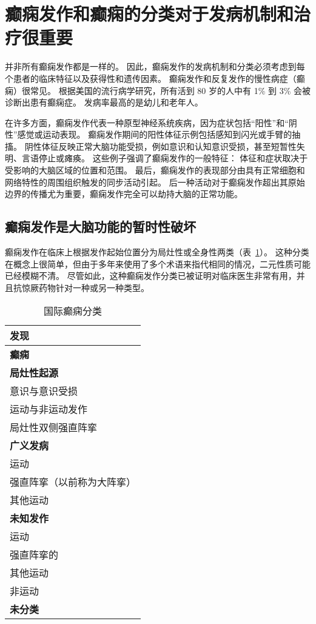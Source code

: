 \section{癫痫发作和癫痫的分类对于发病机制和治疗很重要}

并非所有癫痫发作都是一样的。
因此，癫痫发作的发病机制和分类必须考虑到每个患者的临床特征以及获得性和遗传因素。
癫痫发作和反复发作的慢性病症（癫痫）很常见。
根据美国的流行病学研究，所有活到 80 岁的人中有 1\% 到 3\% 会被诊断出患有癫痫症。
发病率最高的是幼儿和老年人。


在许多方面，癫痫发作代表一种原型神经系统疾病，因为症状包括“阳性”和“阴性”感觉或运动表现。
癫痫发作期间的阳性体征示例包括感知到闪光或手臂的抽搐。
阴性体征反映正常大脑功能受损，例如意识和认知意识受损，甚至短暂性失明、言语停止或瘫痪。
这些例子强调了癫痫发作的一般特征：
体征和症状取决于受影响的大脑区域的位置和范围。
最后，癫痫发作的表现部分由具有正常细胞和网络特性的周围组织触发的同步活动引起。
后一种活动对于癫痫发作超出其原始边界的传播尤为重要，癫痫发作完全可以劫持大脑的正常功能。



\subsection{癫痫发作是大脑功能的暂时性破坏}

癫痫发作在临床上根据发作起始位置分为局灶性或全身性两类（表~\ref{tab:58_1}）。
这种分类在概念上很简单，但由于多年来使用了多个术语来指代相同的情况，二元性质可能已经模糊不清。
尽管如此，这种癫痫发作分类已被证明对临床医生非常有用，并且抗惊厥药物针对一种或另一种类型。


\begin{table}[htbp]
	\caption{国际癫痫分类} \label{tab:58_1} \centering
	\begin{tabular}{l}
		\toprule
		发现 \\
		\midrule
		\textbf{癫痫} \\
		\textbf{局灶性起源} \\
		意识与意识受损 \\
		运动与非运动发作 \\
		局灶性双侧强直阵挛 \\
		\textbf{广义发病} \\
		运动 \\
		强直阵挛（以前称为大阵挛） \\
		其他运动 \\
		\textbf{未知发作} \\
		运动 \\
		强直阵挛的 \\
		其他运动 \\
		非运动 \\
		\textbf{未分类} \\
		\bottomrule
	\end{tabular}
\end{table}


